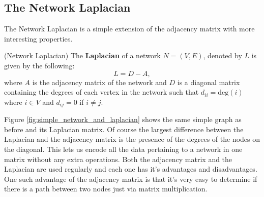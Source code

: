 \subsection{The Network Laplacian}
The Network Laplacian is a simple extension of the adjacency matrix with more interesting properties.

\begin{definition}{(Network Laplacian)}
    The \textbf{Laplacian} of a network $N = (V, E)$, denoted by $L$ is given by the following:
    $$ L = D - A, $$
    where $A$ is the adjacency matrix of the network and $D$ is a diagonal matrix containing the degrees of each vertex in the network such that $d_{ii} = \text{deg}(i)$ where $i \in V$ and $d_{ij} = 0$ if $i \not= j$.
\end{definition}

Figure \ref{fig:simple_network_and_laplacian} shows the same simple graph as before and its Laplacian matrix. Of course the largest difference between the Laplacian and the adjacency matrix is the presence of the degrees of the nodes on the diagonal. This lets us encode all the data pertaining to a network in one matrix without any extra operations. Both the adjacency matrix and the Laplacian are used regularly and each one has it's advantages and disadvantages. One such advantage of the adjacency matrix is that it's very easy to determine if there is a path between two nodes just via matrix multiplication.

